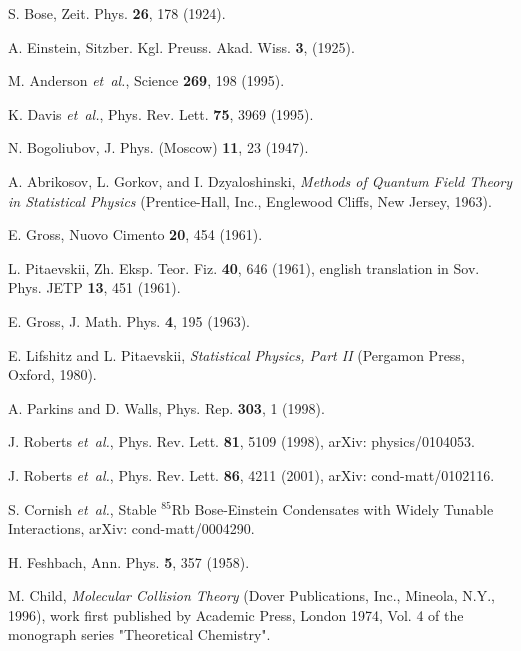 \documentclass[%
   final       %
]{prospectus}
\begin{document}
\begin{thebibliography}{10}

S. Bose, Zeit. Phys. {\bf 26},  178  (1924).

A. Einstein, Sitzber. Kgl. Preuss. Akad. Wiss. {\bf 3},    (1925).

M. Anderson {\it et~al.}, Science {\bf 269},  198  (1995).

K. Davis {\it et~al.}, Phys. Rev. Lett. {\bf 75},  3969  (1995).

N. Bogoliubov, J. Phys. (Moscow) {\bf 11},  23  (1947).

A. Abrikosov, L. Gorkov, and I. Dzyaloshinski, {\em Methods of Quantum Field
  Theory in Statistical Physics} (Prentice-Hall, Inc., Englewood Cliffs, New
  Jersey, 1963).

E. Gross, Nuovo Cimento {\bf 20},  454  (1961).

L. Pitaevskii, Zh. Eksp. Teor. Fiz. {\bf 40},  646  (1961), english translation
  in Sov. Phys. JETP {\bf 13}, 451 (1961).

E. Gross, J. Math. Phys. {\bf 4},  195  (1963).

E. Lifshitz and L. Pitaevskii, {\em Statistical Physics, Part II} (Pergamon
  Press, Oxford, 1980).

A. Parkins and D. Walls, Phys. Rep. {\bf 303},  1  (1998).

J. Roberts {\it et~al.}, Phys. Rev. Lett. {\bf 81},  5109  (1998), arXiv:
  physics/0104053.

J. Roberts {\it et~al.}, Phys. Rev. Lett. {\bf 86},  4211  (2001), arXiv:
  cond-matt/0102116.

S. Cornish {\it et~al.}, Stable $^{85}$Rb Bose-Einstein Condensates with Widely
  Tunable Interactions, arXiv: cond-matt/0004290.

H. Feshbach, Ann. Phys. {\bf 5},  357  (1958).

M. Child, {\em Molecular Collision Theory} (Dover Publications, Inc., Mineola,
  N.Y., 1996), work first published by Academic Press, London 1974, Vol. 4 of
  the monograph series "Theoretical Chemistry".


\end{thebibliography}
\end{document}
